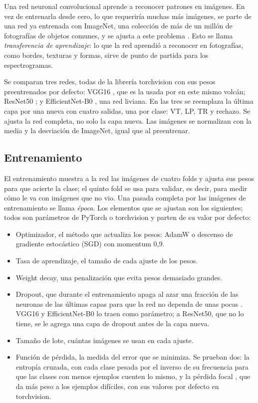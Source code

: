 Una red neuronal convolucional aprende a reconocer patrones en imágenes. En
vez de entrenarla desde cero, lo que requeriría muchas más imágenes, se parte
de una red ya entrenada con ImageNet, una colección de más de un millón de
fotografías de objetos comunes, y se ajusta a este problema \parencite{deng2009imagenet}. Esto se llama
\emph{transferencia de aprendizaje}: lo que la red aprendió a reconocer en
fotografías, como bordes, texturas y formas, sirve de punto de partida para
los espectrogramas.

Se comparan tres redes, todas de la librería torchvision con sus pesos
preentrenados por defecto: VGG16 \parencite{simonyan2015vgg}, que es la usada
por \textcite{espinosacurilem2025ood} en este mismo volcán; ResNet50
\parencite{he2016resnet}; y EfficientNet-B0 \parencite{tan2019efficientnet},
una red liviana. En las tres se reemplaza la última capa por una nueva con
cuatro salidas, una por clase: VT, LP, TR y rechazo. Se ajusta la red completa,
no solo la capa nueva. Las imágenes se normalizan con la media y la desviación
de ImageNet, igual que al preentrenar.

\subsection{Entrenamiento}

El entrenamiento muestra a la red las imágenes de cuatro folds y ajusta sus
pesos para que acierte la clase; el quinto fold se usa para validar, es decir,
para medir cómo le va con imágenes que no vio. Una pasada completa por las
imágenes de entrenamiento se llama \emph{época}. Los elementos que se ajustan
son los siguientes; todos son parámetros de PyTorch o torchvision
\parencite{paszke2019pytorch} y parten de su valor por defecto:

\begin{itemize}
\item Optimizador, el método que actualiza los pesos: AdamW
  \parencite{loshchilov2019adamw} o descenso de gradiente estocástico (SGD)
  con momentum 0,9.
\item Tasa de aprendizaje, el tamaño de cada ajuste de los pesos.
\item Weight decay, una penalización que evita pesos demasiado
  grandes.
\item Dropout, que durante el entrenamiento apaga al azar una
  fracción de las neuronas de las últimas capas para que la red no dependa de
  unas pocas \parencite{srivastava2014dropout}. VGG16 y EfficientNet-B0 lo
  traen como parámetro; a ResNet50, que no lo tiene, se le agrega una capa de
  dropout antes de la capa nueva.
\item Tamaño de lote, cuántas imágenes se usan en cada ajuste.
\item Función de pérdida, la medida del error que se minimiza. Se
  prueban dos: la entropía cruzada, con cada clase pesada por el inverso de su
  frecuencia para que las clases con menos ejemplos cuenten lo mismo, y la
  pérdida focal \parencite{lin2017focal}, que da más peso a los ejemplos
  difíciles, con sus valores por defecto en torchvision.
\end{itemize}

